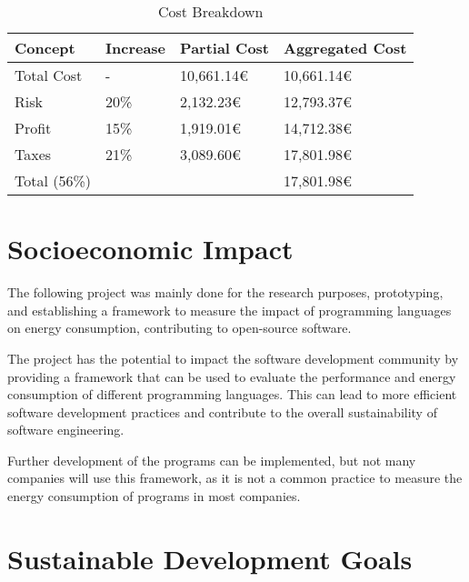 \begin{table}[h]
    \centering
    \begin{tabular}{|l|l|l|l|}
        \hline
        \textbf{Concept}    & \textbf{Increase} & \textbf{Partial Cost} & \textbf{Aggregated Cost} \\
        \hline
        Total Cost          & -       & 10,661.14€  & 10,661.14€ \\
        Risk                & 20\%    & 2,132.23€   & 12,793.37€ \\
        Profit              & 15\%    & 1,919.01€   & 14,712.38€ \\
        Taxes               & 21\%    & 3,089.60€   & 17,801.98€ \\
        \hline
        Total (56\%)        &         &             & 17,801.98€ \\
        \hline
    \end{tabular}
    \caption{Cost Breakdown}
    \label{tab:cost-breakdown}
\end{table}


\section{Socioeconomic Impact}
The following project was mainly done for the research purposes, prototyping, and establishing a framework to measure the impact of programming languages on energy consumption, contributing to open-source software.

The project has the potential to impact the software development community by providing a framework that can be used to evaluate the performance and energy consumption of different programming languages. This can lead to more efficient software development practices and contribute to the overall sustainability of software engineering.

Further development of the programs can be implemented, but not many companies will use this framework, as it is not a common practice to measure the energy consumption of programs in most companies.

\section{Sustainable Development Goals}

